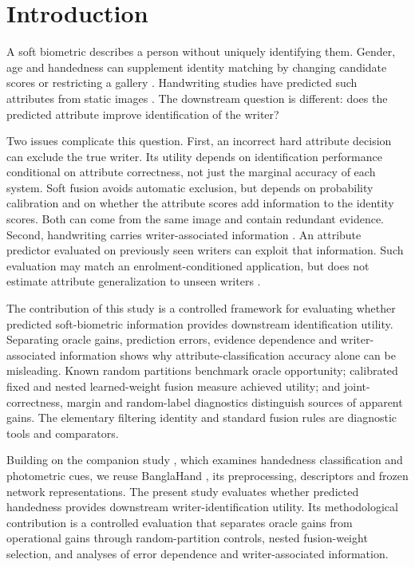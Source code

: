 \section{Introduction}
A soft biometric describes a person without uniquely identifying them. Gender, age and handedness can supplement identity matching by changing candidate scores or restricting a gallery \cite{jain2004soft,dantcheva2016soft}. Handwriting studies have predicted such attributes from static images \cite{liwicki2011gender,siddiqi2015gender,bouadjenek2016soft,almaadeed2016handedness,morera2018handedness,rahmanian2021handedness}. The downstream question is different: does the predicted attribute improve identification of the writer?

Two issues complicate this question. First, an incorrect hard attribute decision can exclude the true writer. Its utility depends on identification performance conditional on attribute correctness, not just the marginal accuracy of each system. Soft fusion avoids automatic exclusion, but depends on probability calibration and on whether the attribute scores add information to the identity scores. Both can come from the same image and contain redundant evidence. Second, handwriting carries writer-associated information \cite{bulacu2007text,schomaker2007codebooks}. An attribute predictor evaluated on previously seen writers can exploit that information. Such evaluation may match an enrolment-conditioned application, but does not estimate attribute generalization to unseen writers \cite{kaufman2012leakage}.

The contribution of this study is a controlled framework for evaluating whether predicted soft-biometric information provides downstream identification utility. Separating oracle gains, prediction errors, evidence dependence and writer-associated information shows why attribute-classification accuracy alone can be misleading. Known random partitions benchmark oracle opportunity; calibrated fixed and nested learned-weight fusion measure achieved utility; and joint-correctness, margin and random-label diagnostics distinguish sources of apparent gains. The elementary filtering identity and standard fusion rules are diagnostic tools and comparators.

Building on the companion study \cite{prappo2026handedness}, which examines handedness classification and photometric cues, we reuse BanglaHand \cite{banglahand2026data}, its preprocessing, descriptors and frozen network representations. The present study evaluates whether predicted handedness provides downstream writer-identification utility. Its methodological contribution is a controlled evaluation that separates oracle gains from operational gains through random-partition controls, nested fusion-weight selection, and analyses of error dependence and writer-associated information.

